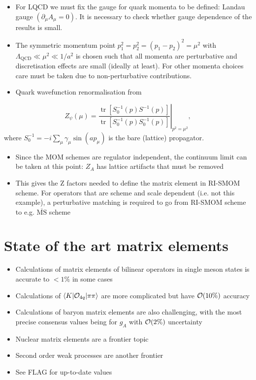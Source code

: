 \begin{itemize}
    \item For LQCD we must fix the gauge for quark momenta to be defined: Landau gauge $(\partial_\mu A_\mu = 0)$. It is necessary to check whether gauge dependence of the results is small.
    \item The symmetric momentum point $p_1^2 = p_2^2 = (p_1 - p_2)^2 = \mu^2$ with $\Lambda_{\text{QCD}} \ll \mu^2 \ll 1/a^2$ is chosen such that all momenta are perturbative and discretisation effects are small (ideally at least). For other momenta choices care must be taken due to non-perturbative contributions.
    \item Quark wavefunction renormalisation from
\end{itemize}
\begin{equation}
    Z_\psi(\mu) = \left. \frac{\operatorname{tr}\left[S_0^{-1}(p)S^{-1}(p)\right]}{\operatorname{tr}\left[S_0^{-1}(p)S_0^{-1}(p)\right]}\right|_{p^2=\mu^2},
\end{equation}
where $S_0^{-1} = -i \sum_\mu \gamma_\mu \sin(a p_\mu)$ is the bare (lattice) propagator.
\begin{itemize}
    \item Since the MOM schemes are regulator independent, the continuum limit can be taken at this point: $Z_A$ has lattice artifacts that must be removed
    \item This gives the Z factors needed to define the matrix element in RI-SMOM scheme. For operators that are scheme and scale dependent (i.e. not this example), a perturbative matching is required to go from RI-SMOM scheme to e.g. $\overline{\text{MS}}$ scheme
\end{itemize}

\section{State of the art matrix elements}
\begin{itemize}
    \item Calculations of matrix elements of bilinear operators in single meson states is accurate to $<1\%$ in some cases
    \item Calculations of $\langle K | {\cal O}_{4q}| \pi \pi \rangle$ are more complicated but have ${\cal O}(10\%)$ accuracy
    \item Calculations of baryon matrix elements are also challenging, with the most precise consensus values being for $g_A$ with ${\cal O}(2\%)$ uncertainty
    \item Nuclear matrix elements are a frontier topic
    \item Second order weak processes are another frontier
    \item See FLAG for up-to-date values
\end{itemize}
